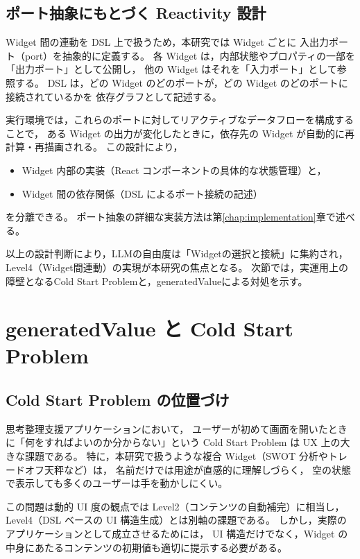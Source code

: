 \documentclass[senior,final,11pt,dvipdfmx]{iputit-thesis}
\begin{document}
\subsection{ポート抽象にもとづく Reactivity 設計}

Widget 間の連動を DSL 上で扱うため，本研究では Widget ごとに
入出力ポート（port）を抽象的に定義する。
各 Widget は，内部状態やプロパティの一部を「出力ポート」として公開し，
他の Widget はそれを「入力ポート」として参照する。
DSL は，どの Widget のどのポートが，どの Widget のどのポートに接続されているかを
依存グラフとして記述する。

実行環境では，これらのポートに対してリアクティブなデータフローを構成することで，
ある Widget の出力が変化したときに，依存先の Widget が自動的に再計算・再描画される。
この設計により，
\begin{itemize}
  \item Widget 内部の実装（React コンポーネントの具体的な状態管理）と，
  \item Widget 間の依存関係（DSL によるポート接続の記述）
\end{itemize}
を分離できる。
ポート抽象の詳細な実装方法は第\ref{chap:implementation}章で述べる。

以上の設計判断により，LLMの自由度は「Widgetの選択と接続」に集約され， Level4（Widget間連動）の実現が本研究の焦点となる。 次節では，実運用上の障壁となるCold Start Problemと，generatedValueによる対処を示す。

\section{generatedValue と Cold Start Problem}

\subsection{Cold Start Problem の位置づけ}

思考整理支援アプリケーションにおいて，
ユーザーが初めて画面を開いたときに「何をすればよいのか分からない」という
Cold Start Problem は UX 上の大きな課題である。
特に，本研究で扱うような複合 Widget（SWOT 分析やトレードオフ天秤など）は，
名前だけでは用途が直感的に理解しづらく，
空の状態で表示しても多くのユーザーは手を動かしにくい。

この問題は動的 UI 度の観点では Level2（コンテンツの自動補完）に相当し，
Level4（DSL ベースの UI 構造生成）とは別軸の課題である。
しかし，実際のアプリケーションとして成立させるためには，
UI 構造だけでなく，Widget の中身にあたるコンテンツの初期値も適切に提示する必要がある。
\end{document}
